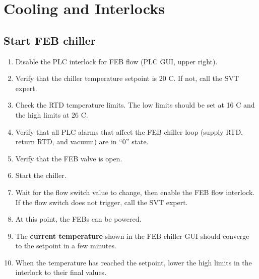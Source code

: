 \section{Cooling and Interlocks}
\label{sec:proc_cooling}
\subsection{Start FEB chiller}
\begin{enumerate}
    \item Disable the PLC interlock for FEB flow (PLC GUI, upper right).
    \item Verify that the chiller temperature setpoint is 20 C. If not, call the SVT expert.
    \item Check the RTD temperature limits. The low limits should be set at 16 C and the high limits at 26 C.
    \item Verify that all PLC alarms that affect the FEB chiller loop (supply RTD, return RTD, and vacuum) are in ``0'' state.
    \item Verify that the FEB valve is open.
    \item Start the chiller.
    \item Wait for the flow switch value to change, then enable the FEB flow interlock.
        If the flow switch does not trigger, call the SVT expert.
    \item At this point, the FEBs can be powered.
    \item The \textbf{current temperature} shown in the FEB chiller GUI should converge to the setpoint in a few minutes.
    \item When the temperature has reached the setpoint, lower the high limits in the interlock to their final values.
\end{enumerate}


